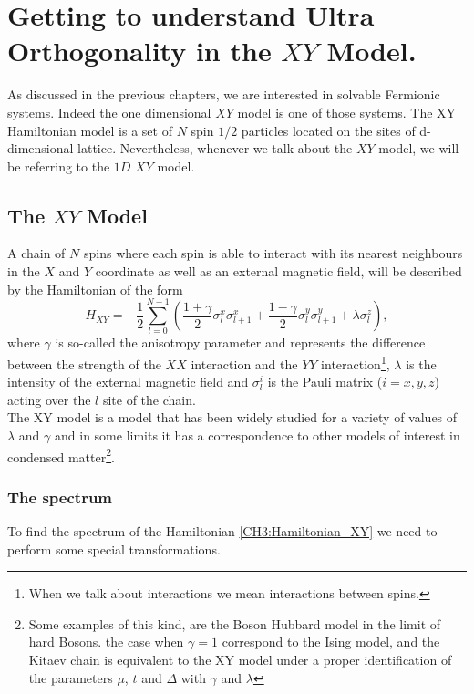 \chapter{Getting to understand Ultra Orthogonality in the $XY$ Model.}

As discussed in the previous chapters, we are interested in solvable Fermionic systems. Indeed the one dimensional $XY$ model is one of those systems\cite{lieb_two_1961}. The XY Hamiltonian model is a set of $N$ spin $1/2$ particles 
located on the sites of d-dimensional lattice. Nevertheless, whenever we talk about the $XY$ model, we will be referring to the $1D$ $XY$ model.
\section{The $XY$ Model}
A chain of $N$ spins where each spin is able to interact with its nearest neighbours in the $X$ and $Y$ coordinate as well as an external magnetic field, will be described by the Hamiltonian of the form
\begin{equation}
H_{X Y}=-\frac{1}{2} \sum_{l=0}^{N-1}\left(\frac{1+\gamma}{2} \sigma_{l}^{x} \sigma_{l+1}^{x}+\frac{1-\gamma}{2} \sigma_{l}^{y} \sigma_{l+1}^{y}+\lambda \sigma_{l}^{z}\right),
\label{CH3:Hamiltonian_XY}
\end{equation}
where $\gamma$ is so-called the anisotropy parameter and represents the difference between the strength of the $XX$ interaction and the $YY$ interaction\footnote{When we talk about interactions we mean interactions between spins.}, $\lambda$ is the intensity of the external magnetic field and $\sigma^{i}_{l}$ is the Pauli matrix ($i= x,y,z$) acting over the $l$ site of the chain.\\
The XY model is a model that has been widely studied for a variety of values of $\lambda$ and $\gamma$ and in some limits it has a correspondence to other models of interest in condensed matter\cite{katsura_statistical_1962,barouch_statistical_1971,barouch_statistical_1970}\footnote{Some examples of this kind, are the Boson Hubbard model in the limit of hard Bosons. the case when $\gamma=1$ correspond to the Ising model, and the Kitaev chain is equivalent to the XY model under a proper identification of the parameters $\mu$, $t$ and $\Delta$ with $\gamma$ and $\lambda$\cite{katsura_statistical_1962,barouch_statistical_1971}}.
\subsection{The spectrum}
To find the spectrum of the Hamiltonian \eqref{CH3:Hamiltonian_XY} we need to perform some special transformations.

